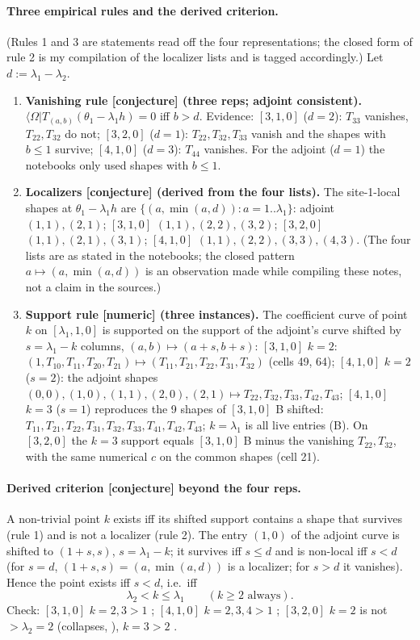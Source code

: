 \documentclass[11pt]{article}
\newcommand{\bra}[1]{\langle #1|}
\newcommand{\Om}{\Omega}
\newcommand{\Tt}[1]{T_{#1}}
\newcommand{\nm}{\textbf{[numeric]}}
\newcommand{\cj}{\textbf{[conjecture]}}
\begin{document}
\paragraph{Three empirical rules and the derived criterion.} (Rules 1 and 3 are statements read off the four representations; the closed form of rule 2 is my compilation of the localizer lists and is tagged accordingly.) Let $d:=\lambda_1-\lambda_2$.
\begin{enumerate}
\item \textbf{Vanishing rule \cj{} (three reps; adjoint consistent).} $\bra\Om T_{(a,b)}(\theta_1-\lambda_1h)=0$ iff $b>d$. Evidence: $[3,1,0]$ ($d=2$): $\Tt{33}$ vanishes, $\Tt{22},\Tt{32}$ do not; $[3,2,0]$ ($d=1$): $\Tt{22},\Tt{32},\Tt{33}$ vanish and the shapes with $b\le1$ survive; $[4,1,0]$ ($d=3$): $\Tt{44}$ vanishes. For the adjoint ($d=1$) the notebooks only used shapes with $b\le1$.
\item \textbf{Localizers \cj{} (derived from the four lists).} The site-1-local shapes at $\theta_1-\lambda_1h$ are $\{(a,\min(a,d)):a=1..\lambda_1\}$: adjoint $(1,1),(2,1)$; $[3,1,0]$ $(1,1),(2,2),(3,2)$; $[3,2,0]$ $(1,1),(2,1),(3,1)$; $[4,1,0]$ $(1,1),(2,2),(3,3),(4,3)$. (The four lists are as stated in the notebooks; the closed pattern $a\mapsto(a,\min(a,d))$ is an observation made while compiling these notes, not a claim in the sources.)
\item \textbf{Support rule \nm{} (three instances).} The coefficient curve of point $k$ on $[\lambda_1,1,0]$ is supported on the support of the adjoint's curve shifted by $s=\lambda_1-k$ columns, $(a,b)\mapsto(a+s,b+s)$: $[3,1,0]$ $k=2$: $(1,\Tt{10},\Tt{11},\Tt{20},\Tt{21})\mapsto(\Tt{11},\Tt{21},\Tt{22},\Tt{31},\Tt{32})$ (cells 49, 64); $[4,1,0]$ $k=2$ ($s=2$): the adjoint shapes $(0,0),(1,0),(1,1),(2,0),(2,1)\mapsto\Tt{22},\Tt{32},\Tt{33},\Tt{42},\Tt{43}$; $[4,1,0]$ $k=3$ ($s=1$) reproduces the 9 shapes of $[3,1,0]$ B shifted: $\Tt{11},\Tt{21},\Tt{22},\Tt{31},\Tt{32},\Tt{33},\Tt{41},\Tt{42},\Tt{43}$; $k=\lambda_1$ is all live entries (B). On $[3,2,0]$ the $k=3$ support equals $[3,1,0]$ B minus the vanishing $\Tt{22},\Tt{32}$, with the same numerical $c$ on the common shapes (cell 21).
\end{enumerate}

\paragraph{Derived criterion \cj{} beyond the four reps.} A non-trivial point $k$ exists iff its shifted support contains a shape that survives (rule 1) and is not a localizer (rule 2). The entry $(1,0)$ of the adjoint curve is shifted to $(1+s,s)$, $s=\lambda_1-k$; it survives iff $s\le d$ and is non-local iff $s<d$ (for $s=d$, $(1+s,s)=(a,\min(a,d))$ is a localizer; for $s>d$ it vanishes). Hence the point exists iff $s<d$, i.e.\ iff
\[
\lambda_2<k\le\lambda_1\qquad(k\ge2\text{ always}).
\]
Check: $[3,1,0]$ $k=2,3>1$ \checkmark; $[4,1,0]$ $k=2,3,4>1$ \checkmark; $[3,2,0]$ $k=2$ is not $>\lambda_2=2$ (collapses, \checkmark), $k=3>2$ \checkmark.
\end{document}

